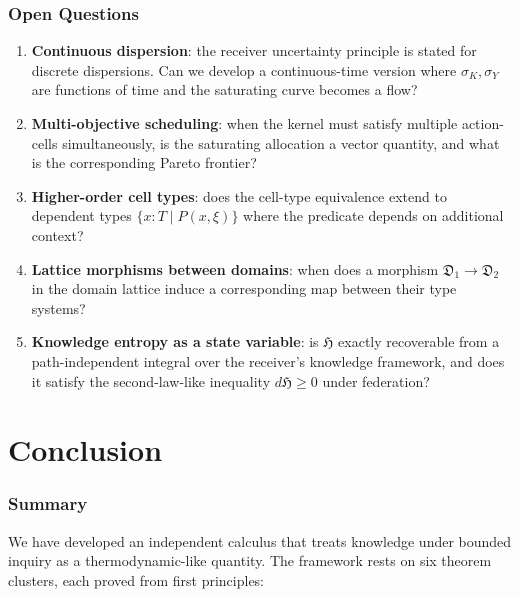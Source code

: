 \documentclass[11pt,a4paper]{article}
\newcommand{\Domain}{\mathfrak{D}}
\newcommand{\disp}{\sigma}
\newcommand{\Hknow}{\mathfrak{H}}
\begin{document}
\section{Open Questions}

\begin{enumerate}[nosep,leftmargin=*]
\item \textbf{Continuous dispersion}: the receiver uncertainty principle is stated for discrete dispersions. Can we develop a continuous-time version where $\disp_K, \disp_Y$ are functions of time and the saturating curve becomes a flow?
\item \textbf{Multi-objective scheduling}: when the kernel must satisfy multiple action-cells simultaneously, is the saturating allocation a vector quantity, and what is the corresponding Pareto frontier?
\item \textbf{Higher-order cell types}: does the cell-type equivalence extend to dependent types $\{x : T \mid P(x, \xi)\}$ where the predicate depends on additional context?
\item \textbf{Lattice morphisms between domains}: when does a morphism $\Domain_1 \to \Domain_2$ in the domain lattice induce a corresponding map between their type systems?
\item \textbf{Knowledge entropy as a state variable}: is $\Hknow$ exactly recoverable from a path-independent integral over the receiver's knowledge framework, and does it satisfy the second-law-like inequality $d\Hknow \geq 0$ under federation?
\end{enumerate}

\part{Conclusion}

\section{Summary}

We have developed an independent calculus that treats knowledge under bounded inquiry as a thermodynamic-like quantity. The framework rests on six theorem clusters, each proved from first principles:
\end{document}
